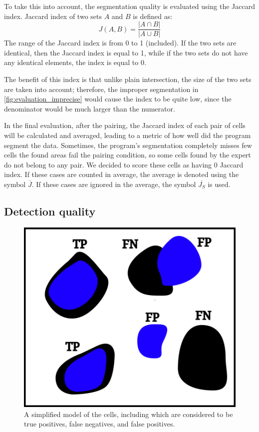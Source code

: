 \documentclass[
  digital,     %
  oneside,     %
  nosansbold,  %
  nocolorbold, %
  lof,         %
  lot,         %
]{fithesis4}
\begin{document}
To take this into account, the segmentation quality is evaluated using the
Jaccard index. Jaccard index of two sets $A$ and $B$ is defined
as\cite{2020eelbode}:
$$J(A, B) = \frac{|A \cap B|}{|A \cup B|}$$
The range of the Jaccard index is from 0 to 1 (included). If the two sets are
identical, then the Jaccard index is equal to 1, while if the two sets do not
have any identical elements, the index is equal to 0.

The benefit of this index is that unlike plain intersection, the size of the two
sets are taken into account; therefore, the improper segmentation in
\ref{fig:evaluation_imprecise} would cause the index to be quite low, since the
denominator would be much larger than the numerator.

In the final evaluation, after the pairing, the Jaccard index of each pair of
cells will be calculated and averaged, leading to a metric of how well did the
program segment the data. Sometimes, the program's segmentation completely
misses few cells the found areas fail the pairing condition, so some cells found
by the expert do not belong to any pair. We decided to score these cells as
having 0 Jaccard index. If these cases are counted in average, the average is
denoted using the symbol $\overline{J}$. If these cases are ignored in the
average, the symbol $\overline{J_S}$ is used.

\subsection{Detection quality}
\begin{figure}
    \begin{center}
        \includegraphics{resources/inkscape/evaluation_with_TP.png}
    \end{center}
    \caption{A simplified model of the cells, including which are considered to
    be true positives, false negatives, and false positives.}
    \label{fig:evaluation_with_TP}
\end{figure}
\end{document}
